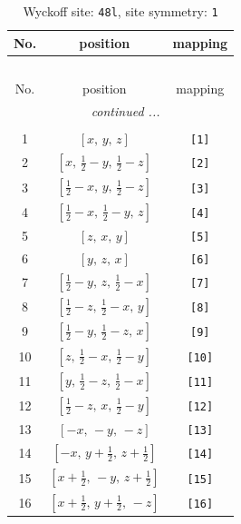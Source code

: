\documentclass[fleqn,8pt]{jsarticle}
\begin{document}
\begin{longtable}{ccc}
\caption{Wyckoff site: {\tt 48l}, site symmetry: {\tt 1}}
 \\
 \hline \hline
No. & position & mapping \\ \hline \endfirsthead

\multicolumn{2}{l}{\tablename\ \thetable{}} \\
 \hline \hline
No. & position & mapping \\ \hline \endhead

 \hline \hline
\multicolumn{2}{r}{\footnotesize\it continued ...} \\ \endfoot

 \hline \hline
\multicolumn{2}{r}{} \\ \endlastfoot

1 & $\left[ x,\, y,\, z \right]$ & {\tt [1]} \\ \hline
2 & $\left[ x,\, \frac{1}{2} - y,\, \frac{1}{2} - z \right]$ & {\tt [2]} \\ \hline
3 & $\left[ \frac{1}{2} - x,\, y,\, \frac{1}{2} - z \right]$ & {\tt [3]} \\ \hline
4 & $\left[ \frac{1}{2} - x,\, \frac{1}{2} - y,\, z \right]$ & {\tt [4]} \\ \hline
5 & $\left[ z,\, x,\, y \right]$ & {\tt [5]} \\ \hline
6 & $\left[ y,\, z,\, x \right]$ & {\tt [6]} \\ \hline
7 & $\left[ \frac{1}{2} - y,\, z,\, \frac{1}{2} - x \right]$ & {\tt [7]} \\ \hline
8 & $\left[ \frac{1}{2} - z,\, \frac{1}{2} - x,\, y \right]$ & {\tt [8]} \\ \hline
9 & $\left[ \frac{1}{2} - y,\, \frac{1}{2} - z,\, x \right]$ & {\tt [9]} \\ \hline
10 & $\left[ z,\, \frac{1}{2} - x,\, \frac{1}{2} - y \right]$ & {\tt [10]} \\ \hline
11 & $\left[ y,\, \frac{1}{2} - z,\, \frac{1}{2} - x \right]$ & {\tt [11]} \\ \hline
12 & $\left[ \frac{1}{2} - z,\, x,\, \frac{1}{2} - y \right]$ & {\tt [12]} \\ \hline
13 & $\left[ - x,\, - y,\, - z \right]$ & {\tt [13]} \\ \hline
14 & $\left[ - x,\, y + \frac{1}{2},\, z + \frac{1}{2} \right]$ & {\tt [14]} \\ \hline
15 & $\left[ x + \frac{1}{2},\, - y,\, z + \frac{1}{2} \right]$ & {\tt [15]} \\ \hline
16 & $\left[ x + \frac{1}{2},\, y + \frac{1}{2},\, - z \right]$ & {\tt [16]} \\ \hline

\end{longtable}
\end{document}
